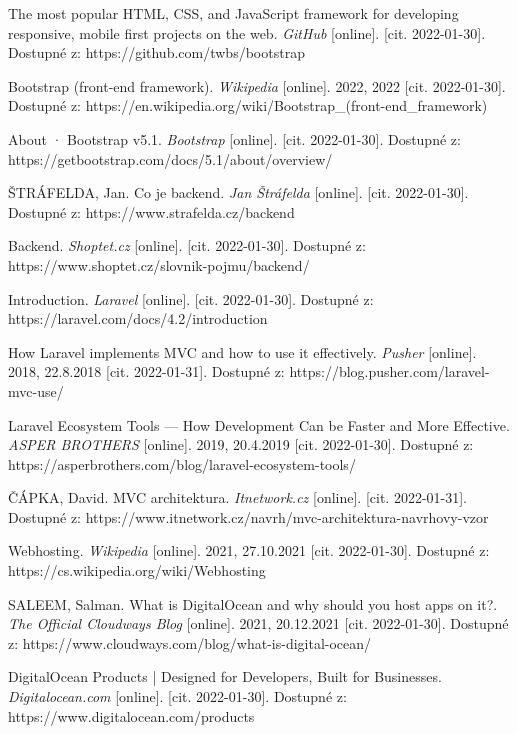 \begin{thebibliography}{50}
The most popular HTML, CSS, and JavaScript framework for developing responsive, mobile first projects on the web. \textit{GitHub} [online]. [cit. 2022-01-30]. Dostupné z: https://github.com/twbs/bootstrap

Bootstrap (front-end framework). \textit{Wikipedia} [online]. 2022, 2022 [cit. 2022-01-30]. Dostupné z: https://en.wikipedia.org/wiki/Bootstrap\_(front-end\_framework)

About · Bootstrap v5.1. \textit{Bootstrap} [online]. [cit. 2022-01-30]. Dostupné z: https://getbootstrap.com/docs/5.1/about/overview/

ŠTRÁFELDA, Jan. Co je backend. \textit{Jan Štráfelda} [online]. [cit. 2022-01-30]. Dostupné z: https://www.strafelda.cz/backend

Backend. \textit{Shoptet.cz} [online]. [cit. 2022-01-30]. Dostupné z: https://www.shoptet.cz/slovnik-pojmu/backend/

Introduction. \textit{Laravel} [online]. [cit. 2022-01-30]. Dostupné z: https://laravel.com/docs/4.2/introduction

How Laravel implements MVC and how to use it effectively. \textit{Pusher} [online]. 2018, 22.8.2018 [cit. 2022-01-31]. Dostupné z: https://blog.pusher.com/laravel-mvc-use/

Laravel Ecosystem Tools --- How Development Can be Faster and More Effective. \textit{ASPER BROTHERS} [online]. 2019, 20.4.2019 [cit. 2022-01-30]. Dostupné z: https://asperbrothers.com/blog/laravel-ecosystem-tools/

ČÁPKA, David. MVC architektura. \textit{Itnetwork.cz} [online]. [cit. 2022-01-31]. Dostupné z: https://www.itnetwork.cz/navrh/mvc-architektura-navrhovy-vzor

Webhosting. \textit{Wikipedia} [online]. 2021, 27.10.2021 [cit. 2022-01-30]. Dostupné z: https://cs.wikipedia.org/wiki/Webhosting

SALEEM, Salman. What is DigitalOcean and why should you host apps on it?. \textit{The Official Cloudways Blog} [online]. 2021, 20.12.2021 [cit. 2022-01-30]. Dostupné z: https://www.cloudways.com/blog/what-is-digital-ocean/

DigitalOcean Products | Designed for Developers, Built for Businesses. \textit{Digitalocean.com} [online]. [cit. 2022-01-30]. Dostupné z: https://www.digitalocean.com/products


\end{thebibliography}
